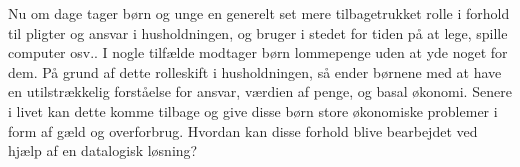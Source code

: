 Nu om dage tager børn og unge en generelt set mere tilbagetrukket rolle i forhold til pligter og ansvar i husholdningen, og bruger i stedet for tiden på at lege, spille computer osv.. I nogle tilfælde modtager børn lommepenge uden at yde noget for dem\cite{Boerneliv}. På grund af dette rolleskift i husholdningen, så ender børnene med at have en utilstrækkelig forståelse for ansvar, værdien af penge, og basal økonomi\cite{BusinessDK2}. Senere i livet kan dette komme tilbage og give disse børn store økonomiske problemer i form af gæld og overforbrug. Hvordan kan disse forhold blive bearbejdet ved hjælp af en datalogisk løsning?
